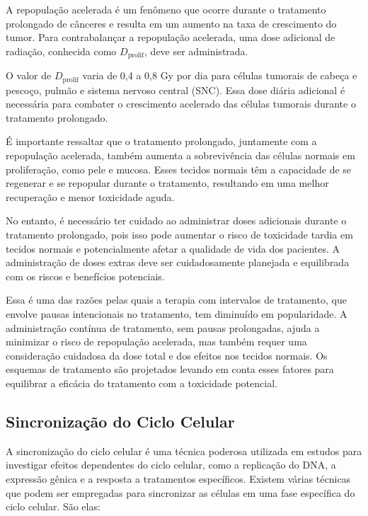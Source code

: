 \documentclass[11pt,a4paper]{article}
\begin{document}
	A repopulação acelerada é um fenômeno que ocorre durante o tratamento prolongado de cânceres e resulta em um aumento na taxa de crescimento do tumor. Para contrabalançar a repopulação acelerada, uma dose adicional de radiação, conhecida como $D_{\text{prolif}}$, deve ser administrada.

	O valor de $D_{\text{prolif}}$ varia de 0,4 a 0,8 Gy por dia para células tumorais de cabeça e pescoço, pulmão e sistema nervoso central (SNC). Essa dose diária adicional é necessária para combater o crescimento acelerado das células tumorais durante o tratamento prolongado.

	É importante ressaltar que o tratamento prolongado, juntamente com a repopulação acelerada, também aumenta a sobrevivência das células normais em proliferação, como pele e mucosa. Esses tecidos normais têm a capacidade de se regenerar e se repopular durante o tratamento, resultando em uma melhor recuperação e menor toxicidade aguda.

	No entanto, é necessário ter cuidado ao administrar doses adicionais durante o tratamento prolongado, pois isso pode aumentar o risco de toxicidade tardia em tecidos normais e potencialmente afetar a qualidade de vida dos pacientes. A administração de doses extras deve ser cuidadosamente planejada e equilibrada com os riscos e benefícios potenciais.

	Essa é uma das razões pelas quais a terapia com intervalos de tratamento, que envolve pausas intencionais no tratamento, tem diminuído em popularidade. A administração contínua de tratamento, sem pausas prolongadas, ajuda a minimizar o risco de repopulação acelerada, mas também requer uma consideração cuidadosa da dose total e dos efeitos nos tecidos normais. Os esquemas de tratamento são projetados levando em conta esses fatores para equilibrar a eficácia do tratamento com a toxicidade potencial.

\subsection*{Sincronização do Ciclo Celular}

	A sincronização do ciclo celular é uma técnica poderosa utilizada em estudos para investigar efeitos dependentes do ciclo celular, como a replicação do DNA, a expressão gênica e a resposta a tratamentos específicos. Existem várias técnicas que podem ser empregadas para sincronizar as células em uma fase específica do ciclo celular. São elas:
\end{document}
